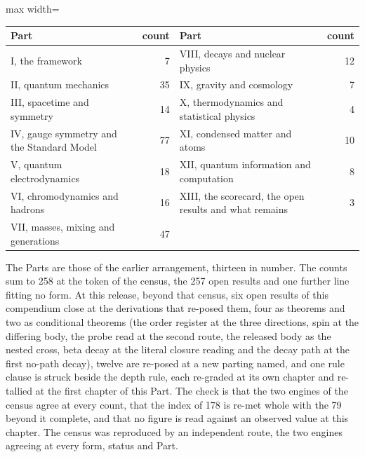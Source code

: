 \begin{chproof}[instrument]
\begin{center}
\begin{adjustbox}{max width=\linewidth}
\begin{tabular}{lrlr}
\hline
Part & count & Part & count \\
\hline
I, the framework & 7 & VIII, decays and nuclear physics & 12 \\
II, quantum mechanics & 35 & IX, gravity and cosmology & 7 \\
III, spacetime and symmetry & 14 & X, thermodynamics and statistical physics & 4 \\
IV, gauge symmetry and the Standard Model & 77 & XI, condensed matter and atoms & 10 \\
V, quantum electrodynamics & 18 & XII, quantum information and computation & 8 \\
VI, chromodynamics and hadrons & 16 & XIII, the scorecard, the open results and what remains & 3 \\
VII, masses, mixing and generations & 47 & & \\
\hline
\end{tabular}\end{adjustbox}
\end{center}
The Parts are those of the earlier arrangement, thirteen in number. The counts sum to 258 at the token of the census, the 257 open results and one further line fitting no form.
At this release, beyond that census, six open results of this compendium close at the derivations that re-posed them, four as theorems and two as conditional theorems (the order register at the three directions, spin at the differing body, the probe read at the second route, the released body as the nested cross, beta decay at the literal closure reading and the decay path at the first no-path decay), twelve are re-posed at a new parting named, and one rule clause is struck beside the depth rule, each re-graded at its own chapter and re-tallied at the first chapter of this Part.
The check is that the two engines of the census agree at every count, that the index of 178 is re-met whole with the 79 beyond it complete, and that no figure is read against an observed value at this chapter.
The census was reproduced by an independent route, the two engines agreeing at every form, status and Part.
\end{chproof}

\par\medskip{}\label{narr:close:14-2}\par
